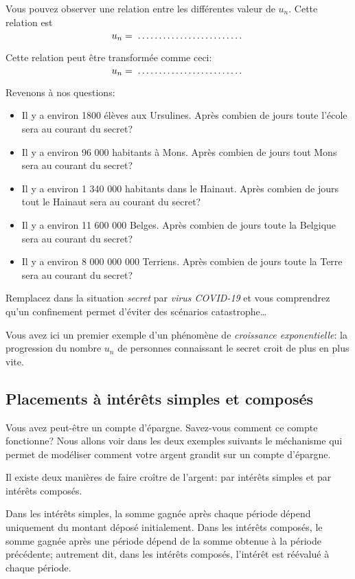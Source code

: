 \documentclass[a4paper,12pt,singlepage]{report}
\newcommand{\jdot}[1]{ \makebox[#1]{\dotfill}}
\begin{document}
Vous pouvez observer une relation entre les différentes valeur de \(u_{n}\). Cette
relation est
\[
u_{n}=\jdot{4cm}
\]

Cette relation peut être transformée comme ceci:
\[
u_{n}=\jdot{4cm}
\]

Revenons à nos questions:

\begin{itemize}
\item Il y a environ 1800 élèves aux Ursulines. Après combien de jours toute l'école
sera au courant du secret?\dotfill
\item Il y a environ 96 000 habitants à Mons. Après combien de jours tout Mons
sera au courant du secret?\dotfill
\item Il y a environ 1 340 000 habitants dans le Hainaut. Après combien de jours
tout le Hainaut sera au courant du secret?\dotfill
\item Il y a environ 11 600 000 Belges. Après combien de jours toute la Belgique
sera au courant du secret?\dotfill
\item Il y a environ 8 000 000 000 Terriens. Après combien de jours toute la Terre
sera au courant du secret?\dotfill
\end{itemize}

Remplacez dans la situation \emph{secret} par \emph{virus COVID-19} et vous comprendrez
qu'un confinement permet d'éviter des scénarios catastrophe\ldots{}

Vous avez ici un premier exemple d'un phénomène de \emph{croissance exponentielle}:
la progression du nombre \(u_{n}\) de personnes connaissant le secret croit de plus
en plus vite.
\subsection{Placements à intérêts simples et composés}
\label{sec:org94464f8}

Vous avez peut-être un compte d'épargne. Savez-vous comment ce compte
fonctionne? Nous allons voir dans les deux exemples suivants le méchanisme qui
permet de modéliser comment votre argent grandit sur un compte d'épargne.

Il existe deux manières de faire croître de l'argent: par intérêts simples et
par intérêts composés.

Dans les intérêts simples, la somme gagnée après chaque période dépend
uniquement du montant déposé initialement. Dans les intérêts composés, le somme
gagnée après une période dépend de la somme obtenue à la période précédente;
autrement dit, dans les intérêts composés, l'intérêt est réévalué à chaque
période.
\end{document}
